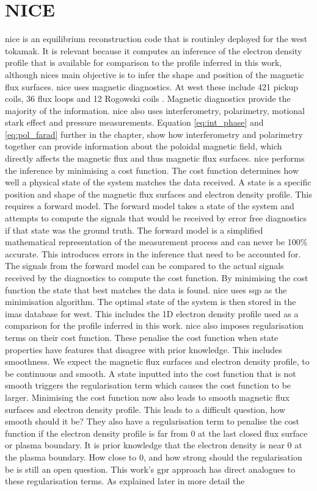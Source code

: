 \section{NICE}

\gls{nice} is an equilibrium reconstruction code that is routinley deployed for the \gls{west} tokamak. It is relevant because it computes an inference of the electron density profile that is available for comparison to the profile inferred in this work, although \glspl{nice} main objective is to infer the shape and position of the magnetic flux surfaces. \gls{nice} uses magnetic diagnostics. At \gls{west} these include 421 pickup coils, 36 flux loops and 12 Rogowski coils \cite{westmagdiag}. Magnetic diagnostics provide the majority of the information. \gls{nice} also uses interferometry, polarimetry, motional stark effect and pressure measurements. Equation \ref{eq:int_phase} and \ref{eq:pol_farad} further in the chapter, show how interferometry and polarimetry together can provide information about the poloidal magnetic field, which directly affects the magnetic flux and thus magnetic flux surfaces. \gls{nice} performs the inference by minimising a cost function. The cost function determines how well a physical state of the system matches the data received. A state is a specific position and shape of the magnetic flux surfaces and electron density profile. This requires a forward model. The forward model takes a state of the system and attempts to compute the signals that would be received by error free diagnostics if that state was the ground truth. The forward model is a simplified mathematical representation of the measurement process and can never be 100\% accurate. This introduces errors in the inference that need to be accounted for. The signals from the forward model can be compared to the actual signals received by the diagnostics to compute the cost function. By minimising the cost function the state that best matches the data is found. \gls{nice} uses \gls{sqp} as the minimisation algorithm. The optimal state of the system is then stored in the \gls{imas} database for \gls{west}. This includes the 1D electron density profile used as a comparison for the profile inferred in this work. \gls{nice} also imposes regularisation terms on their cost function. These penalise the cost function when state properties have features that disagree with prior knowledge. This includes smoothness. We expect the magnetic flux surfaces and electron density profile, to be continuous and smooth. A state inputted into the cost function that is not smooth triggers the regularisation term which causes the cost function to be larger. Minimising the cost function now also leads to smooth magnetic flux surfaces and electron density profile. This leads to a difficult question, how smooth should it be? They also have a regularisation term to penalise the cost function if the electron density profile is far from 0 at the last closed flux surface or plasma boundary. It is prior knowledge that the electron density is near 0 at the plasma boundary. How close to 0, and how strong should the regularisation be is still an open question. This work's \gls{gpr} approach has direct analogues to these regularisation terms. As explained later in more detail the 